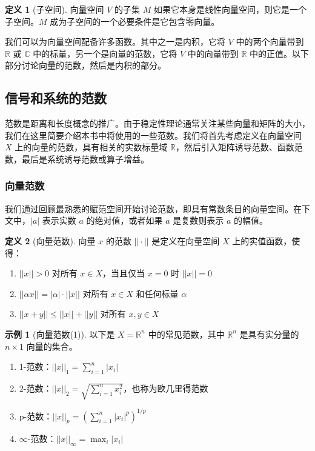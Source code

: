 \documentclass[UTF8,12pt,a4paper]{ctexart}
\theoremstyle{definition}
\newtheorem{definition}{定义}[section]
\newtheorem{example}{示例}[section]
\begin{document}
\begin{definition}[子空间]
向量空间 $V$ 的子集 $M$ 如果它本身是线性向量空间，则它是一个子空间。$M$ 成为子空间的一个必要条件是它包含零向量。
\end{definition}

我们可以为向量空间配备许多函数。其中之一是内积，它将 $V$ 中的两个向量带到 $\mathbb{R}$ 或 $\mathbb{C}$ 中的标量，另一个是向量的范数，它将 $V$ 中的向量带到 $\mathbb{R}$ 中的正值。以下部分讨论向量的范数，然后是内积的部分。

\subsection{信号和系统的范数}

范数是距离和长度概念的推广。由于稳定性理论通常关注某些向量和矩阵的大小，我们在这里简要介绍本书中将使用的一些范数。我们将首先考虑定义在向量空间 $X$ 上的向量的范数，具有相关的实数标量域 $\mathbb{R}$，然后引入矩阵诱导范数、函数范数，最后是系统诱导范数或算子增益。

\subsubsection{向量范数}

我们通过回顾最熟悉的赋范空间开始讨论范数，即具有常数条目的向量空间。在下文中，$|a|$ 表示实数 $a$ 的绝对值，或者如果 $a$ 是复数则表示 $a$ 的幅值。

\begin{definition}[向量范数]
向量 $x$ 的范数 $||\cdot||$ 是定义在向量空间 $X$ 上的实值函数，使得：
\begin{enumerate}
\item $||x|| > 0$ 对所有 $x \in X$，当且仅当 $x=0$ 时 $||x||=0$
\item $||\alpha x|| = |\alpha| \cdot ||x||$ 对所有 $x \in X$ 和任何标量 $\alpha$
\item $||x+y|| \leq ||x|| + ||y||$ 对所有 $x,y \in X$
\end{enumerate}
\end{definition}

\begin{example}[向量范数(1)]
以下是 $X=\mathbb{R}^n$ 中的常见范数，其中 $\mathbb{R}^n$ 是具有实分量的 $n \times 1$ 向量的集合。
\begin{enumerate}
\item 1-范数：$||x||_1 = \sum_{i=1}^{n} |x_i|$
\item 2-范数：$||x||_2 = \sqrt{\sum_{i=1}^{n} x_i^2}$，也称为欧几里得范数
\item p-范数：$||x||_p = \left(\sum_{i=1}^{n} |x_i|^p\right)^{1/p}$
\item $\infty$-范数：$||x||_\infty = \max_i |x_i|$
\end{enumerate}
\end{example}
\end{document}
